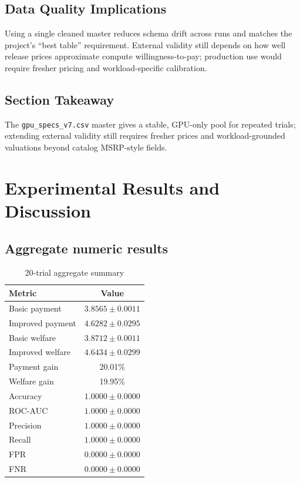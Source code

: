 \documentclass[journal]{IEEEtran}
\begin{document}
\subsection{Data Quality Implications}
Using a single cleaned master reduces schema drift across runs and matches the project's ``best table'' requirement. External validity still depends on how well release prices approximate compute willingness-to-pay; production use would require fresher pricing and workload-specific calibration.

\subsection{Section Takeaway}
The \texttt{gpu\_specs\_v7.csv} master gives a stable, GPU-only pool for repeated trials; extending external validity still requires fresher prices and workload-grounded valuations beyond catalog MSRP-style fields.

\section{Experimental Results and Discussion}
\subsection{Aggregate numeric results}
\begin{table}[t]
\centering
\caption{20-trial aggregate summary}
\label{tab:results}
\begin{tabular}{lc}
\toprule
\textbf{Metric} & \textbf{Value} \\
\midrule
Basic payment & $3.8565 \pm 0.0011$ \\
Improved payment & $4.6282 \pm 0.0295$ \\
Basic welfare & $3.8712 \pm 0.0011$ \\
Improved welfare & $4.6434 \pm 0.0299$ \\
Payment gain & 20.01\% \\
Welfare gain & 19.95\% \\
\midrule
Accuracy & $1.0000 \pm 0.0000$ \\
ROC-AUC & $1.0000 \pm 0.0000$ \\
Precision & $1.0000 \pm 0.0000$ \\
Recall & $1.0000 \pm 0.0000$ \\
FPR & $0.0000 \pm 0.0000$ \\
FNR & $0.0000 \pm 0.0000$ \\
\bottomrule
\end{tabular}
\end{table}
\end{document}
